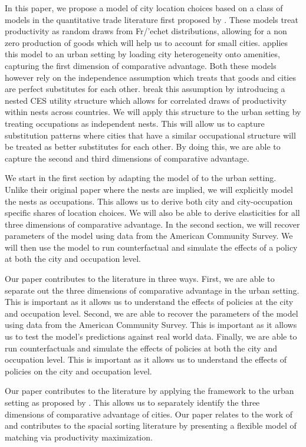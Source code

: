 \documentclass[10pt]{article}
\begin{document}
In this paper, we propose a model of city location choices based on a class of models in the quantitative trade literature first proposed by \cite{ek}. These models treat productivity as random draws from Fr/'{e}chet distributions, allowing for a non zero production of goods which will help us to account for small cities. \cite{redding} applies this model to an urban setting by loading city heterogeneity onto amenities, capturing the first dimension of comparative advantage. Both these models however rely on the independence assumption which treats that goods and cities are perfect substitutes for each other. \cite{lindandramondo} break this assumption by introducing a nested CES utility structure which allows for correlated draws of productivity within nests across countries. We will apply this structure to the urban setting by treating occupations as independent nests. This will allow us to capture substitution patterns where cities that have a similar occupational structure will be treated as better substitutes for each other. By doing this, we are able to capture the second and third dimensions of comparative advantage.

We start in the first section by adapting the model of \cite{lindandramondo} to the urban setting. Unlike their original paper where the nests are implied, we will explicitly model the nests as occupations. This allows us to derive both city and city-occupation specific shares of location choices. We will also be able to derive elasticities for all three dimensions of comparative advantage. In the second section, we will recover parameters of the model using data from the American Community Survey. We will then use the model to run counterfactual and simulate the effects of a policy at both the city and occupation level.

Our paper contributes to the literature in three ways. First, we are able to separate out the three dimensions of comparative advantage in the urban setting. This is important as it allows us to understand the effects of policies at the city and occupation level. Second, we are able to recover the parameters of the model using data from the American Community Survey. This is important as it allows us to test the model's predictions against real world data. Finally, we are able to run counterfactuals and simulate the effects of policies at both the city and occupation level. This is important as it allows us to understand the effects of policies on the city and occupation level.

Our paper contributes to the literature by applying the \cite{lindandramondo} framework to the urban setting as proposed by \cite{redding}. This allows us to separately identify the three dimensions of comparative advantage of cities. Our paper relates to the work of \cite{diamond} and contributes to the spacial sorting literature by presenting a flexible model of matching via productivity maximization.

\newpage


\end{document}
